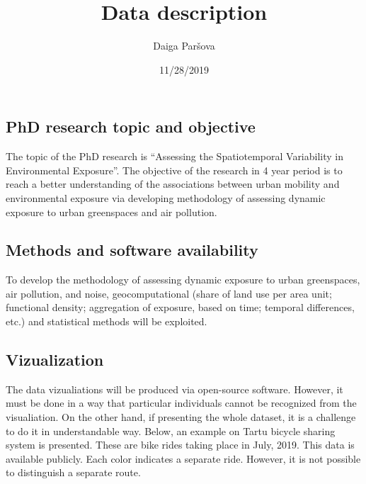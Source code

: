 \documentclass[]{article}
\title{Data description}
\author{Daiga Paršova}
\date{11/28/2019}
\begin{document}
\maketitle

\hypertarget{phd-research-topic-and-objective}{%
\subsection{PhD research topic and
objective}\label{phd-research-topic-and-objective}}

The topic of the PhD research is ``Assessing the Spatiotemporal
Variability in Environmental Exposure''. The objective of the research
in 4 year period is to reach a better understanding of the associations
between urban mobility and environmental exposure via developing
methodology of assessing dynamic exposure to urban greenspaces and air
pollution.

\hypertarget{methods-and-software-availability}{%
\subsection{Methods and software
availability}\label{methods-and-software-availability}}

To develop the methodology of assessing dynamic exposure to urban
greenspaces, air pollution, and noise, geocomputational (share of land
use per area unit; functional density; aggregation of exposure, based on
time; temporal differences, etc.) and statistical methods will be
exploited.

\hypertarget{vizualization}{%
\subsection{Vizualization}\label{vizualization}}

The data vizualiations will be produced via open-source software.
However, it must be done in a way that particular individuals cannot be
recognized from the visualiation. On the other hand, if presenting the
whole dataset, it is a challenge to do it in understandable way. Below,
an example on Tartu bicycle sharing system is presented. These are bike
rides taking place in July, 2019. This data is available publicly. Each
color indicates a separate ride. However, it is not possible to
distinguish a separate route.
\end{document}
